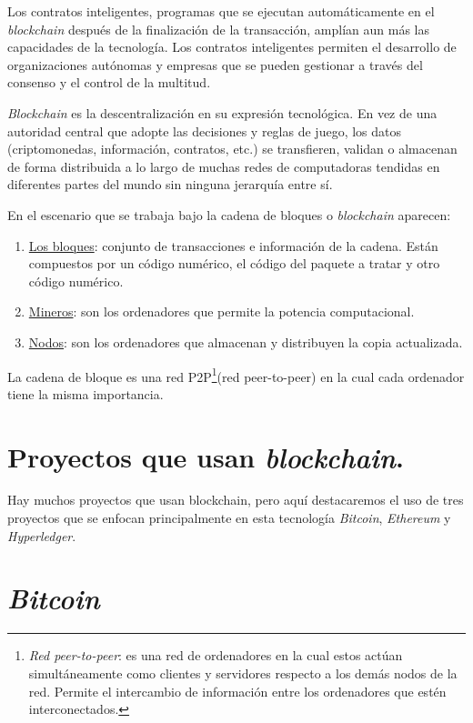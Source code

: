Los contratos inteligentes, programas que se ejecutan automáticamente en el \textit{blockchain} después de la finalización de la transacción, amplían aun más las capacidades de la tecnología. Los contratos inteligentes permiten el desarrollo de organizaciones autónomas y empresas que se pueden gestionar a través del consenso y el control de la multitud.

\textit{Blockchain} es la descentralización en su expresión tecnológica. En vez de una autoridad central que adopte las decisiones y reglas de juego, los datos (criptomonedas, información, contratos, etc.) se transfieren, validan o almacenan de forma distribuida a lo largo de muchas redes de computadoras tendidas en diferentes partes del mundo sin ninguna jerarquía entre sí.

En el escenario que se trabaja bajo la cadena de bloques o \textit{blockchain}  aparecen:
\begin{enumerate}
	\item \underline{Los bloques}: conjunto de transacciones e información de la cadena. Están compuestos por un código numérico, el código del paquete a tratar y otro código numérico. 
	\item \underline{Mineros}: son los ordenadores que permite la potencia computacional.
	\item \underline{Nodos}: son los ordenadores que almacenan y distribuyen la copia actualizada.
\end{enumerate}

La cadena de bloque es una red P2P\footnote{\textit{Red peer-to-peer}: es una red de ordenadores en la cual estos actúan simultáneamente como clientes y servidores respecto a los demás nodos de la red. Permite el intercambio de información entre los ordenadores que estén interconectados.}(red peer-to-peer) en la cual cada ordenador tiene la misma importancia.



\section{Proyectos que usan \textit{blockchain}.}

Hay muchos proyectos que usan blockchain, pero aquí destacaremos el uso de tres proyectos que se enfocan principalmente en esta tecnología \textit{Bitcoin}, \textit{Ethereum} y \textit{Hyperledger}.
\section{\textit{Bitcoin}}
